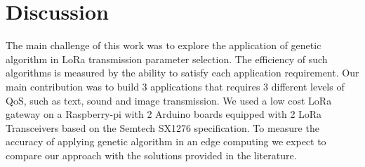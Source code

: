 \section{Discussion} \label{sec:Conclusion}

The main challenge of this work was to explore the application of genetic algorithm in LoRa transmission parameter selection.
The efficiency of such algorithms is measured by the ability to satisfy each application requirement.
Our main contribution was to build 3 applications that requires 3 different levels of QoS,
	such as text, sound and image transmission. 
We used a low cost LoRa gateway on a Raspberry-pi with 2 Arduino boards equipped with 2 LoRa Transceivers based on the Semtech SX1276 specification.
To measure the accuracy of applying genetic algorithm in an edge computing we expect to compare our approach with the solutions provided in the literature.


